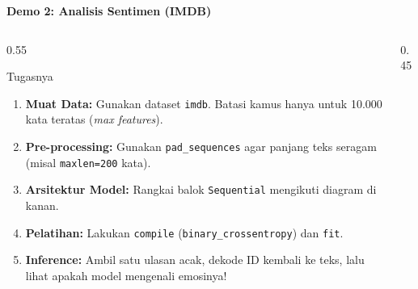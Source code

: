 \documentclass{beamer}
\begin{document}
\begin{frame}{\textbf{Demo 2: Analisis Sentimen (IMDB)}}
    
    \begin{columns}[c] 
        
        \begin{column}{0.55\textwidth}
            \begin{alertblock}{Tugasnya}
                \small 
                \begin{enumerate}
                    \setlength{\itemsep}{0.1cm} 
                    \item \textbf{Muat Data:} Gunakan dataset \texttt{imdb}. Batasi kamus hanya untuk 10.000 kata teratas (\textit{max features}).
                    \item \textbf{Pre-processing:} Gunakan \texttt{pad\_sequences} agar panjang teks seragam (misal \texttt{maxlen=200} kata).
                    \item \textbf{Arsitektur Model:} Rangkai balok \texttt{Sequential} mengikuti diagram di kanan.
                    \item \textbf{Pelatihan:} Lakukan \texttt{compile} (\texttt{binary\_crossentropy}) dan \texttt{fit}.
                    \item \textbf{Inference:} Ambil satu ulasan acak, dekode ID kembali ke teks, lalu lihat apakah model mengenali emosinya!
                \end{enumerate}
            \end{alertblock}
        \end{column}
        
        \begin{column}{0.45\textwidth}
            \centering
\end{column}
\end{columns}
\end{frame}
\end{document}
